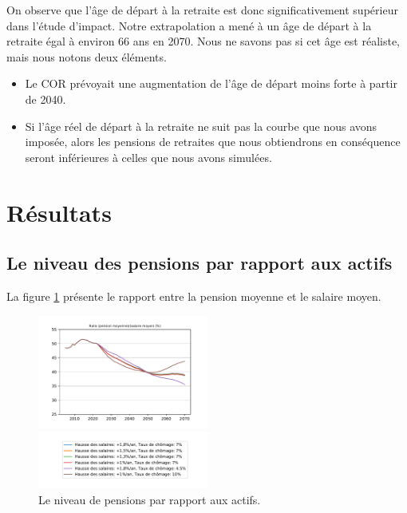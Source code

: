 \documentclass[10pt]{article}
\begin{document}
On observe que l'âge de départ à la retraite est donc 
significativement supérieur dans l'étude d'impact. 
Notre extrapolation a mené à un âge de départ à la retraite égal à 
environ 66 ans en 2070. 
Nous ne savons pas si cet âge est réaliste, mais nous notons deux éléments. 
\begin{itemize}
\item Le COR prévoyait une augmentation de l'âge de départ moins 
forte à partir de 2040. 
\item Si l'âge réel de départ à la retraite ne suit pas la courbe 
que nous avons imposée, alors les pensions de retraites que nous 
obtiendrons en conséquence seront inférieures à celles que nous avons 
simulées. 
\end{itemize}


\section{Résultats}


\subsection{Le niveau des pensions par rapport aux actifs}

La figure \ref{fig-simulation-P} présente le rapport entre la pension moyenne et le salaire moyen. 

\begin{figure}
\centering
\includegraphics[width=0.5\textwidth]{Simulation-P.pdf}

\includegraphics[width=0.5\textwidth]{Simulation-legende.pdf}

\caption{Le niveau de pensions par rapport aux actifs.}
\label{fig-simulation-P}
\end{figure}
\end{document}
